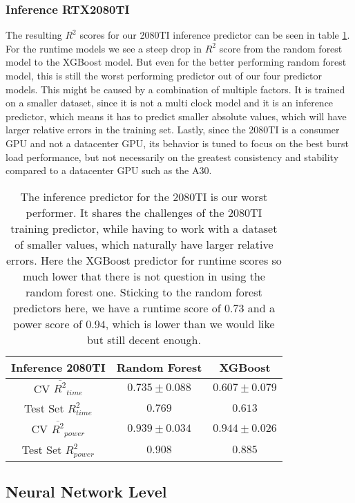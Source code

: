 \subsubsection{Inference RTX2080TI}

The resulting $R^2$ scores for our 2080TI inference predictor can be seen in table \ref{tab:pred_res_2080_inf}. For the runtime models we see a steep drop in $R^2$ score from the random forest model to the XGBoost model. But even for the better performing random forest model, this is still the worst performing predictor out of our four predictor models. This might be caused by a combination of multiple factors. It is trained on a smaller dataset, since it is not a multi clock model and it is an inference predictor, which means it has to predict smaller absolute values, which will have larger relative errors in the training set. Lastly, since the 2080TI is a consumer GPU and not a datacenter GPU, its behavior is tuned to focus on the best burst load performance, but not necessarily on the greatest consistency and stability compared to a datacenter GPU such as the A30.


\begin{table}[h!]
\centering
\begin{tabular}{|c|c|c|}
\hline
 \textbf{Inference 2080TI}& \textbf{Random Forest} & \textbf{XGBoost} \\
\hline
CV $\overline{R^2}_{time}$ & $0.735 \pm 0.088$ &  $0.607 \pm 0.079$ \\
\hline
Test Set $R^2_{time}$ & $0.769$ & $0.613$ \\
\hline
CV $\overline{R^2}_{power}$ & $0.939 \pm 0.034$  &  $0.944 \pm 0.026$\\
\hline
Test Set $R^2_{power}$ & $0.908$ & $0.885$ \\
\hline
\end{tabular}
\caption{The inference predictor for the 2080TI is our worst performer. It shares the challenges of the 2080TI training predictor, while having to work with a dataset of smaller values, which naturally have larger relative errors. Here the XGBoost predictor for runtime scores so much lower that there is not question in using the random forest one. Sticking to the random forest predictors here, we have a runtime score of $0.73$ and a power score of $0.94$, which is lower than we would like but still decent enough.}
\label{tab:pred_res_2080_inf}
\end{table}


\subsection{Neural Network Level}


